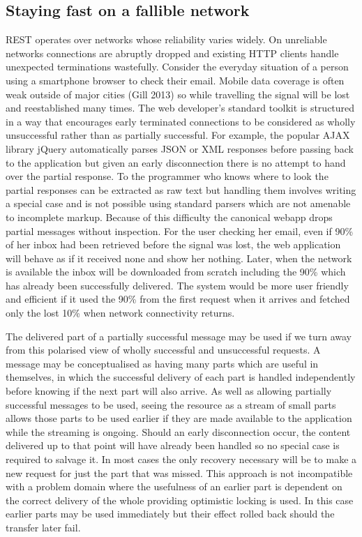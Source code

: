 \documentclass[12pt, ]{article}
\begin{document}
\subsection{Staying fast on a fallible
network}\label{staying-fast-on-a-fallible-network}

REST operates over networks whose reliability varies widely. On
unreliable networks connections are abruptly dropped and existing HTTP
clients handle unexpected terminations wastefully. Consider the everyday
situation of a person using a smartphone browser to check their email.
Mobile data coverage is often weak outside of major cities (Gill 2013)
so while travelling the signal will be lost and reestablished many
times. The web developer's standard toolkit is structured in a way that
encourages early terminated connections to be considered as wholly
unsuccessful rather than as partially successful. For example, the
popular AJAX library jQuery automatically parses JSON or XML responses
before passing back to the application but given an early disconnection
there is no attempt to hand over the partial response. To the programmer
who knows where to look the partial responses can be extracted as raw
text but handling them involves writing a special case and is not
possible using standard parsers which are not amenable to incomplete
markup. Because of this difficulty the canonical webapp drops partial
messages without inspection. For the user checking her email, even if
90\% of her inbox had been retrieved before the signal was lost, the web
application will behave as if it received none and show her nothing.
Later, when the network is available the inbox will be downloaded from
scratch including the 90\% which has already been successfully
delivered. The system would be more user friendly and efficient if it
used the 90\% from the first request when it arrives and fetched only
the lost 10\% when network connectivity returns.

The delivered part of a partially successful message may be used if we
turn away from this polarised view of wholly successful and unsuccessful
requests. A message may be conceptualised as having many parts which are
useful in themselves, in which the successful delivery of each part is
handled independently before knowing if the next part will also arrive.
As well as allowing partially successful messages to be used, seeing the
resource as a stream of small parts allows those parts to be used
earlier if they are made available to the application while the
streaming is ongoing. Should an early disconnection occur, the content
delivered up to that point will have already been handled so no special
case is required to salvage it. In most cases the only recovery
necessary will be to make a new request for just the part that was
missed. This approach is not incompatible with a problem domain where
the usefulness of an earlier part is dependent on the correct delivery
of the whole providing optimistic locking is used. In this case earlier
parts may be used immediately but their effect rolled back should the
transfer later fail.
\end{document}
